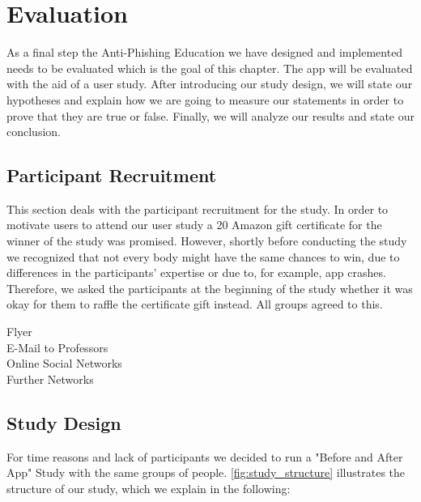 \section{Evaluation}
\label{s:evaluation}
 As a final step the Anti-Phishing Education we have designed and implemented needs to be evaluated which is the goal of this chapter.
 The app will be evaluated with the aid of a user study.
 After introducing our study design, we will state our hypotheses and explain how we are going to measure our statements in order to prove that they are true or false.
 Finally, we will analyze our results and state our conclusion.


\subsection{Participant Recruitment}
This section deals with the participant recruitment for the study.
In order to motivate users to attend our user study a 20\€ Amazon gift certificate for the winner of the study was promised.
However, shortly before conducting the study we recognized that not every body might have the same chances to win, due to differences in the participants' expertise or due to, for example, app crashes.
Therefore, we asked the participants at the beginning of the study whether it was okay for them to raffle the certificate gift instead.
All groups agreed to this.

\begin{description}
	\item[Flyer]  
\item[E-Mail to Professors]
\item[Online Social Networks]
\item[Further Networks]
\end{description}



\subsection{Study Design}
For time reasons and lack of participants we decided to run a "Before and After App" Study with the same groups of people.
 \autoref{fig:study_structure} illustrates the structure of our study, which we explain in the following: 

